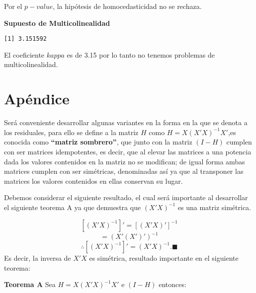 \documentclass[
  a4paper,
  oneside,
  openany]{book}
\newenvironment{Shaded}{\begin{snugshade}}{\end{snugshade}}
\newcommand{\DecValTok}[1]{\textcolor[rgb]{0.00,0.00,0.81}{#1}}
\newcommand{\KeywordTok}[1]{\textcolor[rgb]{0.13,0.29,0.53}{\textbf{#1}}}
\newcommand{\NormalTok}[1]{#1}
\newcommand{\OperatorTok}[1]{\textcolor[rgb]{0.81,0.36,0.00}{\textbf{#1}}}
\begin{document}
Por el \(p-value\), la hipótesis de homocedasticidad no se rechaza.

\textbf{Supuesto de Multicolinealidad}

\begin{Shaded}
\end{Shaded}

\begin{verbatim}
[1] 3.151592
\end{verbatim}

El coeficiente \(kappa\) es de 3.15 por lo tanto no tenemos problemas de multicolinealidad.

\hypertarget{apuxe9ndice}{%
\chapter{Apéndice}\label{apuxe9ndice}}

Será conveniente desarrollar algunas variantes en la forma en la que se denota a los residuales, para ello se define a la matriz \(H\) como \(H=X(X'X)^{-1}X'\),es conocida como \textbf{``matriz sombrero''}, que junto con la matriz \((I-H)\) cumplen con ser matrices idempotentes, es decir, que al elevar las matrices a una potencia dada los valores contenidos en la matriz no se modifican; de igual forma ambas matrices cumplen con ser simétricas, denominadas así ya que al transponer las matrices los valores contenidos en ellas conservan su lugar.

Debemos considerar el siguiente resultado, el cual será importante al desarrollar el siguiente teorema A ya que demuestra que \((X'X)^{-1}\) es una matriz simétrica.

\[[(X'X)^{-1}]'=[(X'X)']^{-1}\]
\[=(X'(X')')^{-1}\]
\[\therefore [(X'X)^{-1}]'= (X'X)^{-1}. \blacksquare\]
Es decir, la inversa de \(X'X\) es simétrica, resultado importante en el siguiente teorema:

\textbf{Teorema A} Sea \(H=X(X'X)^{-1}X'\) e \((I-H)\) entonces:
\end{document}
